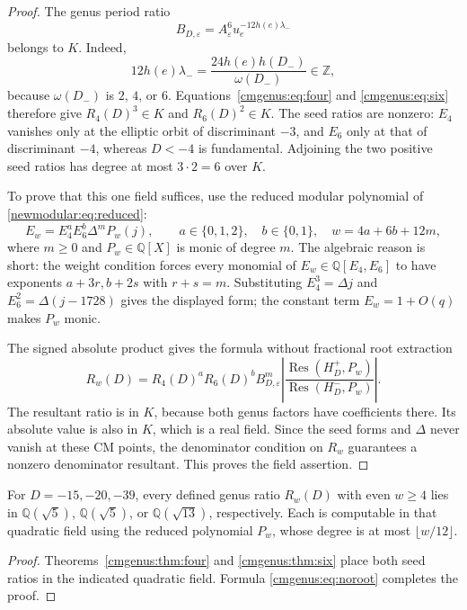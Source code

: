 \begin{proof}
The genus period ratio
\[
 B_{D,\varepsilon}=A_\varepsilon^6
              u_e^{-12h(e)\lambda_-}
\]
belongs to $K$. Indeed,
\[
 12h(e)\lambda_-=
 \frac{24h(e)h(D_-)}{\omega(D_-)}\in\mathbb Z,
\]
because $\omega(D_-)$ is $2$, $4$, or $6$.
Equations~\eqref{cmgenus:eq:four} and \eqref{cmgenus:eq:six} therefore
give $R_4(D)^3\in K$ and $R_6(D)^2\in K$.
The seed ratios are nonzero: $E_4$ vanishes only at the elliptic orbit
of discriminant $-3$, and $E_6$ only at that of discriminant $-4$,
whereas $D<-4$ is fundamental. Adjoining the two positive seed ratios
has degree at most $3\cdot2=6$ over $K$.

To prove that this one field suffices, use the reduced modular
polynomial of \eqref{newmodular:eq:reduced}:
\begin{equation}
 E_w=E_4^aE_6^b\Delta^m P_w(j),\qquad
 a\in\{0,1,2\},\quad b\in\{0,1\},\quad
 w=4a+6b+12m,
 \label{cmgenus:eq:smallpolynomial}
\end{equation}
where $m\geq0$ and $P_w\in\mathbb Q[X]$ is monic of degree $m$.
The algebraic reason is short: the weight condition forces every
monomial of $E_w\in\mathbb Q[E_4,E_6]$ to have exponents
$a+3r,b+2s$ with $r+s=m$. Substituting
$E_4^3=\Delta j$ and $E_6^2=\Delta(j-1728)$ gives the displayed
form; the constant term $E_w=1+O(q)$ makes $P_w$ monic.

The signed absolute product gives the formula without fractional
root extraction
\begin{equation}
 R_w(D)=R_4(D)^aR_6(D)^b B_{D,\varepsilon}^{m}
       \left|\frac{\operatorname{Res}(H_D^+,P_w)}
                    {\operatorname{Res}(H_D^-,P_w)}\right|.
 \label{cmgenus:eq:noroot}
\end{equation}
The resultant ratio is in $K$, because both genus factors have
coefficients there. Its absolute value is also in $K$, which is a
real field. Since the seed forms and $\Delta$ never vanish at these
CM points, the denominator condition on $R_w$ guarantees a nonzero
denominator resultant. This proves the field assertion.
\end{proof}

\begin{corollary}
\label{cmgenus:cor:closure}
For $D=-15,-20,-39$, every defined genus ratio $R_w(D)$ with even
$w\geq4$ lies in $\mathbb Q(\sqrt5)$, $\mathbb Q(\sqrt5)$, or
$\mathbb Q(\sqrt{13})$, respectively. Each is computable in that
quadratic field using the reduced polynomial $P_w$, whose degree
is at most $\lfloor w/12\rfloor$.
\end{corollary}
\begin{proof}
Theorems~\ref{cmgenus:thm:four} and \ref{cmgenus:thm:six} place both
seed ratios in the indicated quadratic field. Formula
\eqref{cmgenus:eq:noroot} completes the proof.
\end{proof}

